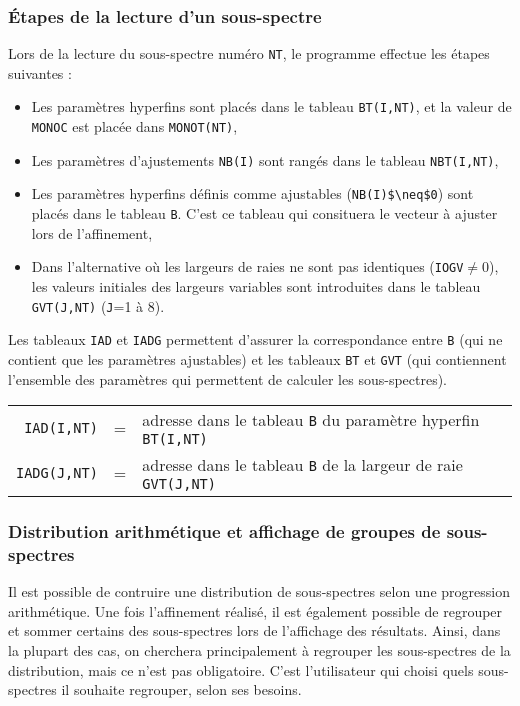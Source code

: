 \subsubsection{\'Etapes de la lecture d'un sous-spectre}
Lors de la lecture du sous-spectre numéro \lstinline{NT}, le programme effectue les étapes suivantes :
\begin{itemize}
  \item Les paramètres hyperfins sont placés dans le tableau \lstinline{BT(I,NT)}, et la valeur de \lstinline{MONOC} est placée dans \lstinline{MONOT(NT)},
  \item Les paramètres d'ajustements \lstinline{NB(I)} sont rangés dans le tableau \lstinline{NBT(I,NT)},
  \item Les paramètres hyperfins définis comme ajustables (\lstinline{NB(I)$\neq$0}) sont placés dans le tableau \lstinline{B}.
   C'est ce tableau qui consituera le vecteur à ajuster lors de l'affinement,
  \item Dans l'alternative où les largeurs de raies ne sont pas identiques (\lstinline{IOGV}$\neq$0), les valeurs initiales des largeurs variables sont introduites dans le tableau \lstinline{GVT(J,NT)} (\lstinline{J}=1 à 8). 
\end{itemize}

Les tableaux \lstinline{IAD} et \lstinline{IADG} permettent d'assurer la correspondance entre \lstinline{B} 
(qui ne contient que les paramètres ajustables) et les tableaux \lstinline{BT} et \lstinline{GVT} (qui contiennent l'ensemble des paramètres qui permettent de calculer les sous-spectres).

\begin{tabular}{rcl}
  \lstinline{IAD(I,NT)}&=&adresse dans le tableau \lstinline{B}  du paramètre  hyperfin \lstinline{BT(I,NT)}\\
  \lstinline{IADG(J,NT)}&=&adresse dans le tableau \lstinline{B} de la largeur de raie \lstinline{GVT(J,NT)}\\
\end{tabular}
\subsubsection{Distribution arithmétique et affichage de groupes de sous-spectres}
Il est possible de contruire une distribution de sous-spectres selon une progression arithmétique.
Une fois l'affinement réalisé, il est également possible de regrouper et sommer certains des sous-spectres lors de l'affichage des résultats. 
Ainsi, dans la plupart des cas, on cherchera principalement à regrouper les sous-spectres de la distribution, mais ce n'est pas obligatoire.
C'est l'utilisateur qui choisi quels sous-spectres il souhaite regrouper, selon ses besoins.

